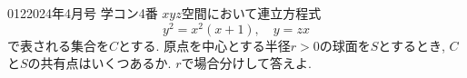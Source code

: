 \begin{prob}{012}{}{2024年4月号 学コン4番}
 $xyz$空間において連立方程式
 \[
 y^2 = x^2(x+1), \quad y=zx
 \]
 で表される集合を$C$とする. 原点を中心とする半径$r>0$の球面を$S$とするとき, $C$と$S$の共有点はいくつあるか. $r$で場合分けして答えよ.
\end{prob}
